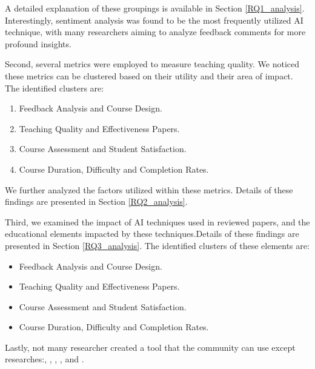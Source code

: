 A detailed explanation of these groupings is available in Section \ref{RQ1_analysis}. Interestingly, sentiment analysis was found to be the most frequently utilized AI technique, with many researchers aiming to analyze feedback comments for more profound insights.

Second, several metrics were employed to measure teaching quality. We noticed these metrics can be clustered based on their utility and their area of impact. The identified clusters are:

\begin{enumerate}
  \item Feedback Analysis and Course Design.
  \item Teaching Quality and Effectiveness Papers.
  \item Course Assessment and Student Satisfaction.
  \item Course Duration, Difficulty and Completion Rates.
\end{enumerate}

We further analyzed the factors utilized within these metrics. Details of these findings are presented in Section \ref{RQ2_analysis}.

Third, we examined the impact of AI techniques used in reviewed papers, and the educational elements impacted by these techniques.Details of these findings are presented in Section \ref{RQ3_analysis}. The identified clusters of these elements are:

\begin{itemize}
  \item Feedback Analysis and Course Design.
  \item Teaching Quality and Effectiveness Papers.
  \item Course Assessment and Student Satisfaction.
  \item Course Duration, Difficulty and Completion Rates.
\end{itemize}

Lastly, not many researcher created a tool that the community can use except researches:\cite{Palaute:_An_Online_Text_Mining_Tool_for_Analyzing_Written_Student_Course_Feedback},
\cite{SUFAT_An_Analytics_Tool_for_Gaining_Insights_from_Student_Feedback_Comments},
\cite{Online_reviews_evaluation_system_for_higher_education_institution:_An_aspect_based_sentiment_analysis_tool},
\cite{Assessing_learners_satisfaction_in_collaborative_online_courses_through_a_big_data_approach}, and 
\cite{Analyzing_educational_comments_for_topics_and_sentiments:_A_text_analytics_approach}.


